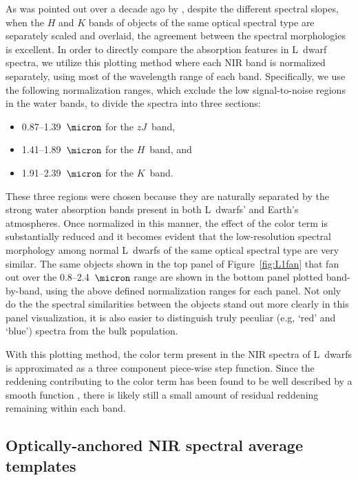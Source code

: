 \documentclass[12pt,preprint]{aastex}
\begin{document}
As was pointed out over a decade ago by \citet{Leggett:2003tm}, despite the different spectral slopes, when the $H$ and $K$ bands of objects of the same optical spectral type are separately scaled and overlaid, the agreement between the spectral morphologies is excellent.
In order to directly compare the absorption features in L~dwarf spectra, we utilize this plotting method where each NIR band is normalized separately, using most of the wavelength range of each band. 
Specifically, we use the following normalization ranges, which exclude the low signal-to-noise regions in the water bands, to divide the spectra into three sections: 
\begin{itemize} \itemsep1pt \parskip0pt 
\item 0.87--1.39~$\micron$ for the $zJ$~band,
\item 1.41--1.89~$\micron$ for the $H$~band, and 
\item 1.91--2.39~$\micron$ for the $K$~band.
\end{itemize}
These three regions were chosen because they are naturally separated by the strong water absorption bands present in both L~dwarfs' and Earth's atmospheres. 
Once normalized in this manner, the effect of the color term is substantially reduced and it becomes evident that the low-resolution spectral morphology among normal L~dwarfs of the same optical spectral type are very similar. 
The same objects shown in the top panel of Figure~\ref{fig:L1fan} that fan out over the 0.8--2.4~$\micron$ range are shown in the bottom panel plotted band-by-band, using the above defined normalization ranges for each panel. 
Not only do the the spectral similarities between the objects stand out more clearly in this panel visualization, it is also easier to distinguish truly peculiar (e.g, `red' and `blue') spectra from the bulk population.

With this plotting method, the color term present in the NIR spectra of L~dwarfs is approximated as a three component piece-wise step function. Since the reddening contributing to the color term has been found to be well described by a smooth function \citep{Marocco:2014kr,Hiranaka:2016va}, there is likely still a small amount of residual reddening remaining within each band.

\clearpage
\subsection{Optically-anchored NIR spectral average templates}
\label{sec:templates}
\end{document}
